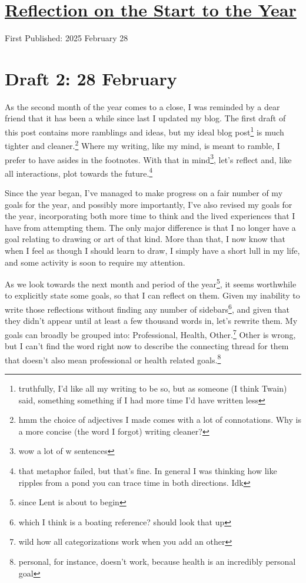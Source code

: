 \documentclass[12pt]{article}[titlepage]
\renewcommand{\,}{\textsuperscript{,}}
\begin{document}
\doublespacing
\section{\href{reflection-february-2025html}{Reflection on the Start to the Year}}
First Published: 2025 February 28

\section{Draft 2: 28 February}  
As the second month of the year comes to a close, I was reminded by a dear friend that it has been a while since last I updated my blog.  
The first draft of this post contains more ramblings and ideas, but my ideal blog post\footnote{truthfully, I'd like all my writing to be so, but as someone (I think Twain) said, something something if I had more time I'd have written less} is much tighter and cleaner.\footnote{hmm the choice of adjectives I made comes with a lot of connotations. Why is a more concise (the word I forgot) writing cleaner?}  
Where my writing, like my mind, is meant to ramble, I prefer to have asides in the footnotes.  
With that in mind\footnote{wow a lot of w sentences}, let's reflect and, like all interactions, plot towards the future.\footnote{that metaphor failed, but that's fine. In general I was thinking how like ripples from a pond you can trace time in both directions. Idk}

Since the year began, I've managed to make progress on a fair number of my goals for the year, and possibly more importantly, I've also revised my goals for the year, incorporating both more time to think and the lived experiences that I have from attempting them.  
The only major difference is that I no longer have a goal relating to drawing or art of that kind.  
More than that, I now know that when I feel as though I should learn to draw, I simply have a short lull in my life, and some activity is soon to require my attention.

As we look towards the next month and period of the year\footnote{since Lent is about to begin}, it seems worthwhile to explicitly state some goals, so that I can reflect on them.  
Given my inability to write those reflections without finding any number of sidebars\footnote{which I think is a boating reference? should look that up}, and given that they didn't appear until at least a few thousand words in, let's rewrite them.  
My goals can broadly be grouped into: Professional, Health, Other.\footnote{wild how all categorizations work when you add an other}  
Other is wrong, but I can't find the word right now to describe the connecting thread for them that doesn't also mean professional or health related goals.\footnote{personal, for instance, doesn't work, because health is an incredibly personal goal}
\end{document}
